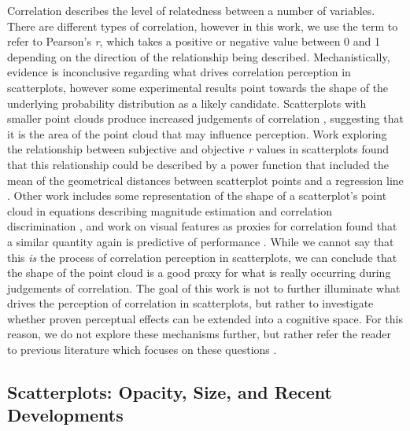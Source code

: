 \documentclass[manuscript,screen,review,anonymous]{acmart}
\begin{document}
Correlation describes the level of relatedness between a number of
variables. There are different types of correlation, however in this
work, we use the term to refer to Pearson's \emph{r}, which takes a
positive or negative value between 0 and 1 depending on the direction of
the relationship being described. Mechanistically, evidence is
inconclusive regarding what drives correlation perception in
scatterplots, however some experimental results point towards the shape
of the underlying probability distribution as a likely candidate.
Scatterplots with smaller point clouds produce increased judgements of
correlation \citep{cleveland_1982}, suggesting that it is the area of
the point cloud that may influence perception. Work exploring the
relationship between subjective and objective \emph{r} values in
scatterplots found that this relationship could be described by a power
function that included the mean of the geometrical distances between
scatterplot points and a regression line \citep{meyer_1997}. Other work
includes some representation of the shape of a scatterplot's point cloud
in equations describing magnitude estimation and correlation
discrimination \citep{meyer_1997, rensink_2017}, and work on visual
features as proxies for correlation found that a similar quantity again
is predictive of performance \citep{yang_2019}. While we cannot say that
this \emph{is} the process of correlation perception in scatterplots, we
can conclude that the shape of the point cloud is a good proxy for what
is really occurring during judgements of correlation. The goal of this
work is not to further illuminate what drives the perception of
correlation in scatterplots, but rather to investigate whether proven
perceptual effects can be extended into a cognitive space. For this
reason, we do not explore these mechanisms further, but rather refer the
reader to previous literature which focuses on these questions
\citep{rensink_2010, rensink_2017, strain_2023, strain_2024}.

\subsection{Scatterplots: Opacity, Size, and Recent
Developments}\label{sec-scatterplots}
\end{document}
